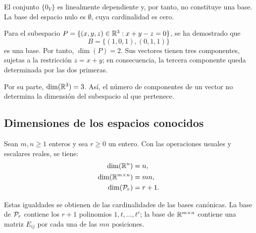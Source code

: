 \documentclass[compacto,10pt]{pubciencias-notas}
\begin{document}
\begin{obs}
    El conjunto $\{0_V\}$ es linealmente dependiente y, por tanto,
    no constituye una base. La base del espacio nulo es $\emptyset$,
    cuya cardinalidad es cero.
\end{obs}

\begin{ejem}
    Para el subespacio $P=\{(x,y,z)\in\R^3:x+y-z=0\}$, se ha demostrado que
    \[
        B=\{(1,0,1),(0,1,1)\}
    \]
    es una base. Por tanto, $\dim(P)=2$. Sus vectores tienen tres
    componentes, sujetas a la restricción $z=x+y$; en consecuencia,
    la tercera componente queda determinada por las dos primeras.

    Por su parte, $\dim(\R^3)=3$. Así, el número de componentes de un
    vector no determina la dimensión del subespacio al que pertenece.
\end{ejem}

\subsection{Dimensiones de los espacios conocidos}

\begin{teo}\label{sem10cl02:dimensiones}
    Sean $m,n\ge1$ enteros y sea $r\ge0$ un entero. Con las operaciones
    usuales y escalares reales, se tiene:
    \[
        \begin{aligned}
            \dim(\R^n)&=n,\\
            \dim(\Mat[\R]{m}{n})&=mn,\\
            \dim(\Pol_r)&=r+1.
        \end{aligned}
    \]
\end{teo}

Estas igualdades se obtienen de las cardinalidades de las bases canónicas.
La base de $\Pol_r$ contiene los $r+1$ polinomios $1,t,\ldots,t^r$;
la base de $\Mat[\R]{m}{n}$ contiene una matriz $E_{ij}$ por cada
una de las $mn$ posiciones.
\end{document}
